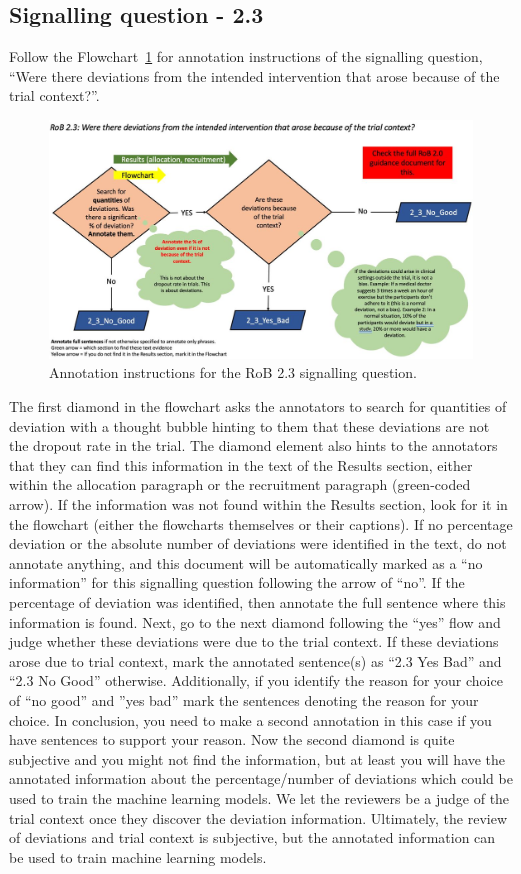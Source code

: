 \documentclass[sn-mathphys,Numbered]{sn-jnl}%
\begin{document}
\subsection*{Signalling question - 2.3}
\label{subsec:2_3}
%
Follow the Flowchart~\ref{fig:2_3} for annotation instructions of the signalling question, ``Were there deviations from the intended intervention that arose because of the trial context?''.
%
\begin{figure}[hbt]
    \centering
    \includegraphics[width=\textwidth]{figures/2_3.jpg}
    \caption{Annotation instructions for the RoB 2.3 signalling question.}
    \label{fig:2_3}
\end{figure}
%


The first diamond in the flowchart asks the annotators to search for quantities of deviation with a thought bubble hinting to them that these deviations are not the dropout rate in the trial.
The diamond element also hints to the annotators that they can find this information in the text of the Results section, either within the allocation paragraph or the recruitment paragraph (green-coded arrow).
If the information was not found within the Results section, look for it in the flowchart (either the flowcharts themselves or their captions).
If no percentage deviation or the absolute number of deviations were identified in the text, do not annotate anything, and this document will be automatically marked as a ``no information'' for this signalling question following the arrow of ``no''.
If the percentage of deviation was identified, then annotate the full sentence where this information is found.
Next, go to the next diamond following the ``yes'' flow and judge whether these deviations were due to the trial context.
If these deviations arose due to trial context, mark the annotated sentence(s) as ``2.3 Yes Bad'' and ``2.3 No Good'' otherwise.
Additionally, if you identify the reason for your choice of ``no good'' and ''yes bad'' mark the sentences denoting the reason for your choice.
In conclusion, you need to make a second annotation in this case if you have sentences to support your reason.
Now the second diamond is quite subjective and you might not find the information, but at least you will have the annotated information about the percentage/number of deviations which could be used to train the machine learning models.
We let the reviewers be a judge of the trial context once they discover the deviation information.
Ultimately, the review of deviations and trial context is subjective, but the annotated information can be used to train machine learning models.
%
%
%
\end{document}

